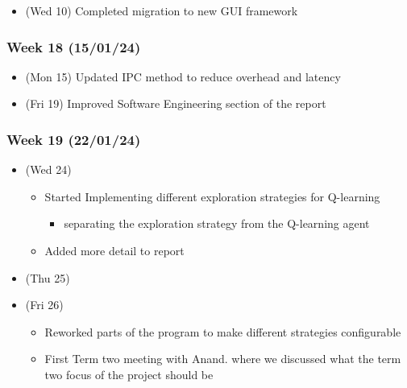 \begin{itemize}
\tightlist
\item
  (Wed 10) Completed migration to new GUI framework
\end{itemize}

\hypertarget{week-18-150124}{%
\subsubsection{Week 18 (15/01/24)}\label{week-18-150124}}

\begin{itemize}
\tightlist
\item
  (Mon 15) Updated IPC method to reduce overhead and latency
\item
  (Fri 19) Improved Software Engineering section of the report
\end{itemize}

\hypertarget{week-19-220124}{%
\subsubsection{Week 19 (22/01/24)}\label{week-19-220124}}

\begin{itemize}
\tightlist
\item
  (Wed 24)

  \begin{itemize}
  \tightlist
  \item
    Started Implementing different exploration strategies for Q-learning

    \begin{itemize}
    \tightlist
    \item
      separating the exploration strategy from the Q-learning agent
    \end{itemize}
  \item
    Added more detail to report
  \end{itemize}
\item
  (Thu 25)
\item
  (Fri 26)

  \begin{itemize}
  \tightlist
  \item
    Reworked parts of the program to make different strategies
    configurable
  \item
    First Term two meeting with Anand. where we discussed what the term
    two focus of the project should be
  \end{itemize}
\end{itemize}

